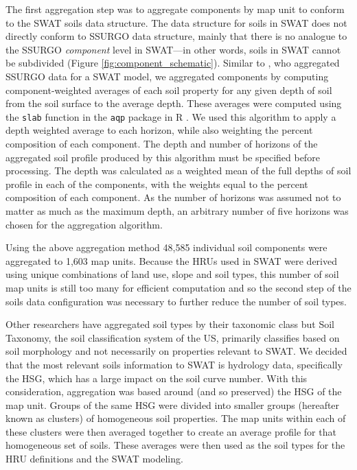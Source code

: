 The first aggregation step was to aggregate components by map unit to conform to
the SWAT soils data structure. The data structure for soils in SWAT does not
directly conform to SSURGO data structure, mainly that there is no analogue to
the SSURGO \textit{component} level in SWAT---in other words, soils in SWAT
cannot be subdivided (Figure \ref{fig:component_schematic}).
Similar to \citet{gatzke_aggregation_2011}, who aggregated SSURGO data for a
SWAT model, we aggregated components by computing component-weighted averages of
each soil property for any given depth of soil from the soil surface to the
average depth. These averages were computed using the \texttt{slab} function in
the \texttt{aqp} package in R \citep{beaudette_algorithms_2013}. We used this
algorithm to apply a depth weighted average to each horizon, while also
weighting the percent composition of each component. The depth and number of
horizons of the aggregated soil profile produced by this algorithm must be
specified before processing. The depth was calculated as a weighted mean of the
full depths of soil profile in each of the components, with the weights equal to
the percent composition of each component. As the number of horizons was assumed
not to matter as much as the maximum depth, an arbitrary number of five horizons
was chosen for the aggregation algorithm.

Using the above aggregation method 48,585 individual soil components were
aggregated to 1,603 map units. Because the HRUs used in SWAT were derived using
unique combinations of land use, slope and soil types, this number of soil map
units is still too many for efficient computation  and so the second step of the
soils data configuration was necessary to further reduce the number of soil
types.

Other researchers have aggregated soil types by their taxonomic class
\citep{gatzke_aggregation_2011} but Soil Taxonomy, the soil classification
system of the US, primarily classifies based on soil morphology and not
necessarily on properties relevant to SWAT. We decided that the most relevant
soils information to SWAT is hydrology data, specifically the HSG, which has a
large impact on the soil curve number. With this consideration, aggregation was
based around (and so preserved) the HSG of the map unit. Groups of the same HSG
were divided into smaller groups (hereafter known as clusters) of homogeneous
soil properties. The map units within each of these clusters were then averaged
together to create an average profile for that homogeneous set of soils. These
averages were then used as the soil types for the HRU definitions and the SWAT
modeling.

